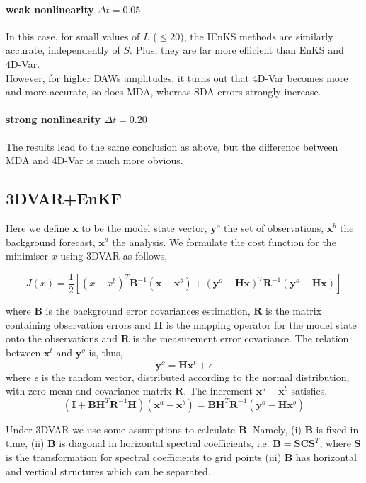 \documentclass[a4,12pt]{article}
\begin{document}
\paragraph{weak nonlinearity $\Delta t = 0.05$}
In this case, for small values of $L$ ($\leq 20$), the IEnKS methods are similarly accurate, independently of $S$. Plus, they are far more efficient than EnKS and 4D-Var. \\
However, for higher DAWs amplitudes, it turns out that 4D-Var becomes more and more accurate, so does MDA, whereas SDA errors strongly increase.

\paragraph{strong nonlinearity $\Delta t = 0.20$}
The results lead to the same conclusion as above, but the difference between MDA and 4D-Var is much more obvious.

\subsection{3DVAR+EnKF}
Here we define $\textbf{x}$ to be the model state vector, $\textbf{y}^{o}$ the set of observations, $\textbf{x}^{b}$ the background forecast, $\textbf{x}^{a}$ the analysis. We formulate the cost function for the minimiser $x$ using 3DVAR as follows,

$$J(x) = \frac{1}{2}[(x-x^{b})^{T}\textbf{B}^{-1}(\textbf{x}-\textbf{x}^{b})+(\textbf{y}^{o}-\textbf{H}\textbf{x})^{T}\textbf{R}^{-1}(\textbf{y}^{o}-\textbf{Hx})]$$

where $\textbf{B}$ is the background error covariances estimation, $\textbf{R}$ is the matrix containing observation errors and $\textbf{H}$ is the mapping operator for the model state onto the observations and  $\textbf{R}$ is the measurement error covariance. The relation between $\textbf{x}^{t}$ and $\textbf{y}^{o}$ is, thus, $$\textbf{y}^{o} = \textbf{H}\textbf{x}^{t} + \epsilon$$ where $\epsilon$ is the random vector, distributed according to the normal distribution, with zero mean and covariance matrix $\textbf{R}$. The increment $\textbf{x}^{a} - \textbf{x}^{b}$ satisfies, 
$$(\textbf{I} + \textbf{BH}^{T}\textbf{R}^{-1}\textbf{H})(\textbf{x}^{a}-\textbf{x}^{b}) = \textbf{B}\textbf{H}^{T}\textbf{R}^{-1}(\textbf{y}^{o}-\textbf{H}\textbf{x}^{b})$$   

Under 3DVAR we use some assumptions to calculate $\textbf{B}$. Namely, (i) $\textbf{B}$ is fixed in time, (ii) $\textbf{B}$ is diagonal in horizontal spectral coefficients, i.e. $\textbf{B} = \textbf{S}\textbf{C}\textbf{S}^{T}$, where $\textbf{S}$ is the transformation for spectral coefficients to grid points (iii) $\textbf{B}$ has horizontal and vertical structures which can be separated. 

\newpage


\end{document}
